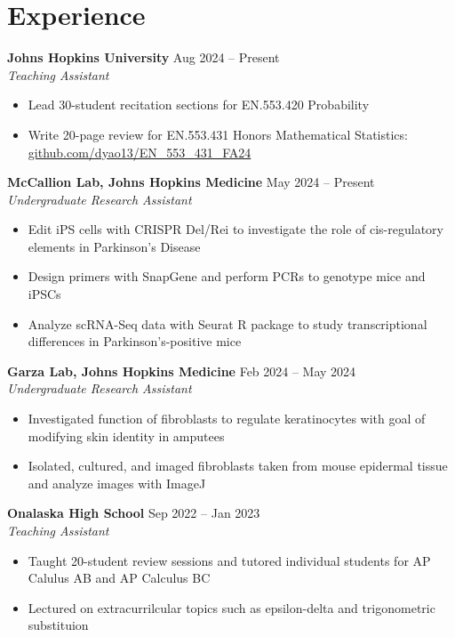 \documentclass[11pt]{article}       %
\begin{document}
\vspace{-9pt}

\section*{Experience}
\textbf{Johns Hopkins University} \hfill Aug 2024 – Present \\
\textit{Teaching Assistant} \vspace{-9pt} \\
\begin{itemize}
  \item Lead 30-student recitation sections for EN.553.420 Probability
  \item Write 20-page review for EN.553.431 Honors Mathematical Statistics: \href{https://github.com/dyao13/EN\_553\_431\_FA24}{github.com/dyao13/EN\_553\_431\_FA24}
\end{itemize}

\textbf{McCallion Lab, Johns Hopkins Medicine} \hfill May 2024 – Present \\
\textit{Undergraduate Research Assistant} \vspace{-9pt} \\
\begin{itemize}
  \item Edit iPS cells with CRISPR Del/Rei to investigate the role of cis-regulatory elements in Parkinson’s Disease
  \item Design primers with SnapGene and perform PCRs to genotype mice and iPSCs
  \item Analyze scRNA-Seq data with Seurat R package to study transcriptional differences in Parkinson’s-positive mice
\end{itemize}

\textbf{Garza Lab, Johns Hopkins Medicine} \hfill Feb 2024 – May 2024 \\
\textit{Undergraduate Research Assistant} \vspace{-9pt} \\
\begin{itemize}
  \item Investigated function of fibroblasts to regulate keratinocytes with goal of modifying skin identity in amputees
  \item Isolated, cultured, and imaged fibroblasts taken from mouse epidermal tissue and analyze images with ImageJ
\end{itemize}

\textbf{Onalaska High School} \hfill Sep 2022 – Jan 2023 \\
\textit{Teaching Assistant} \vspace{-9pt} \\
\begin{itemize}
  \item Taught 20-student review sessions and tutored individual students for AP Calulus AB and AP Calculus BC
  \item Lectured on extracurrilcular topics such as epsilon-delta and trigonometric substituion
\end{itemize}
\end{document}
